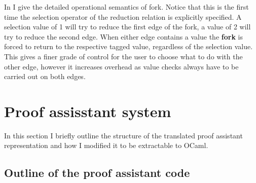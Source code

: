 \documentclass[12pt,twoside,notitlepage]{report}
\theoremstyle{plain}%
\theoremstyle{definition}
\theoremstyle{remark}
\begin{document}

In  I give the detailed operational semantics of fork. Notice that this is the first time the selection operator of the reduction relation is explicitly specified. A selection value of 1 will try to reduce the first edge of the fork, a value of 2 will try to reduce the second edge. When either edge contains a value the \textbf{fork} is forced to return to the respective tagged value, regardless of the selection value. This gives a finer grade of control for the user to choose what to do with the other edge, however it increases overhead as value checks always have to be carried out on both edges.   \clearpage
\section{Proof assisstant system}
In this section I briefly outline the structure of the translated proof assistant representation and how I modified it to be extractable to OCaml. 
\subsection{Outline of the proof assistant code}
\end{document}
